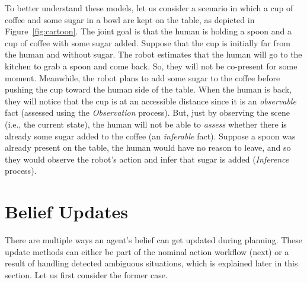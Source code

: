 \documentclass[letterpaper]{article} %
\begin{document}

To better understand these models, let
us consider a scenario in which a cup of coffee and some sugar in a bowl are kept on the table, as depicted in Figure~\ref{fig:cartoon}. The joint goal is that the human is holding a spoon and a cup of coffee with some sugar added. 
Suppose that the cup is initially far from the human and without sugar. 
The robot estimates that the human will go to the kitchen to grab a spoon and come back. So, they will not be co-present for some moment. 
Meanwhile, the robot plans to add some sugar to the coffee before pushing the cup toward the human side of the table.
When the human is back, they will notice that the cup is at an accessible distance since it is an \textit{observable} fact (assessed using the \textit{Observation} process). 
But, just by observing the scene (i.e., the current state), the human will not be able to \textit{assess} whether there is already some sugar added to the coffee (an \textit{inferable} fact). 
Suppose a spoon was already present on the table, the human would have no reason to leave, and so they would observe the robot's action and infer that sugar is added (\textit{Inference} process).


\section{Belief Updates}
There are multiple ways an agent's belief can get updated during planning. These update methods can either be part of the nominal action workflow (next) or a result of handling detected ambiguous situations, which is explained later in this section. Let us first consider the former case.
\end{document}
